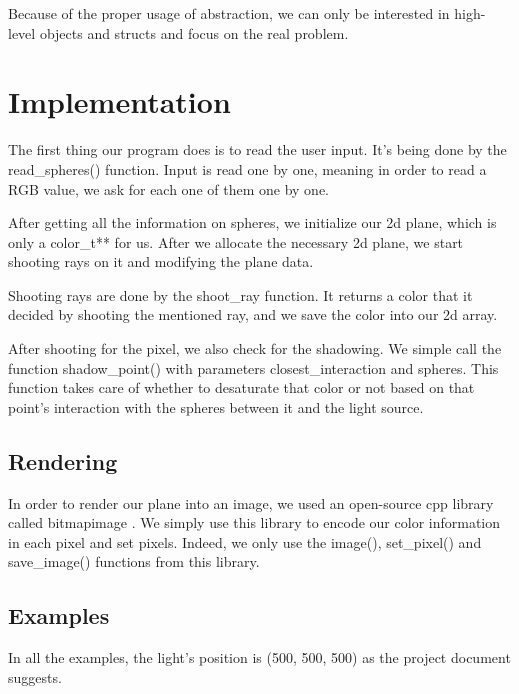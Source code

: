 \documentclass{article}
\begin{document}
Because of the proper usage of abstraction, we can only be interested in high-level objects and structs and focus on the real problem.

\section{Implementation}
\label{implementation}
The first thing our program does is to read the user input. It's being done by the read\_spheres() function. Input is read one by one, meaning in order to read a RGB value, we ask for each one of them one by one.

\par After getting all the information on spheres, we initialize our 2d plane, which is only a color\_t** for us. After we allocate the necessary 2d plane, we start shooting rays on it and modifying the plane data.

\par Shooting rays are done by the shoot\_ray function. It returns a color that it decided by shooting the mentioned ray, and we save the color into our 2d array.

After shooting for the pixel, we also check for the shadowing. We simple call the function shadow\_point() with parameters closest\_interaction and spheres. This function takes care of whether to desaturate that color or not based on that point's interaction with the spheres between it and the light source.

\subsection{Rendering}
\label{rendering}
In order to render our plane into an image, we used an open-source cpp library called bitmapimage \cite{bitmapimage}. We simply use this library to encode our color information in each pixel and set pixels. Indeed, we only use the image(), set\_pixel() and save\_image() functions from this library.

\newpage

\subsection{Examples}
\label{examples}
In all the examples, the light's position is (500, 500, 500) as the project document suggests.
\end{document}
